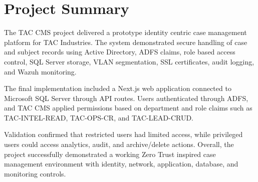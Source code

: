 
\raggedright

\section{Project Summary}

The TAC CMS project delivered a prototype identity centric case management platform for TAC Industries. The system demonstrated secure handling of case and subject records using Active Directory, ADFS claims, role based access control, SQL Server storage, VLAN segmentation, SSL certificates, audit logging, and Wazuh monitoring.

The final implementation included a Next.js web application connected to Microsoft SQL Server through API routes. Users authenticated through ADFS, and TAC CMS applied permissions based on department and role claims such as TAC-INTEL-READ, TAC-OPS-CR, and TAC-LEAD-CRUD.

Validation confirmed that restricted users had limited access, while privileged users could access analytics, audit, and archive/delete actions. Overall, the project successfully demonstrated a working Zero Trust inspired case management environment with identity, network, application, database, and monitoring controls.
